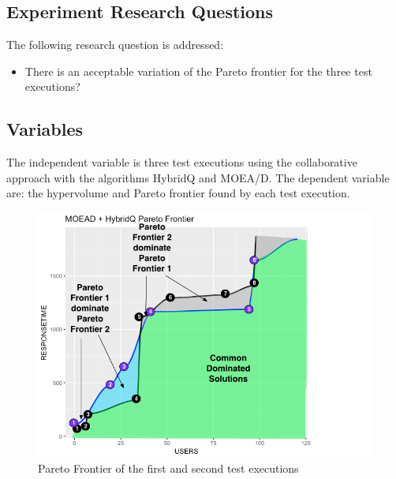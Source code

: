 \documentclass[espaco=umemeio,chapter=TITLE,twoside,openright]{abnt}
\begin{document}
\subsection{Experiment Research Questions}

The following research question is addressed:
\begin{itemize}
\item There is an acceptable variation of the Pareto frontier for the three test executions?
\end{itemize}


\subsection{Variables}

The independent variable is three test executions using the collaborative approach with the algorithms HybridQ and MOEA/D. The dependent variable are: the hypervolume and Pareto frontier found by each test execution.

\begin{figure}[h]
\centering
\includegraphics[width=1\textwidth]{./images/comparative.png}
    \caption{Pareto Frontier of the first and second test executions}
\label{fig:comp1}
\end{figure}
\end{document}
